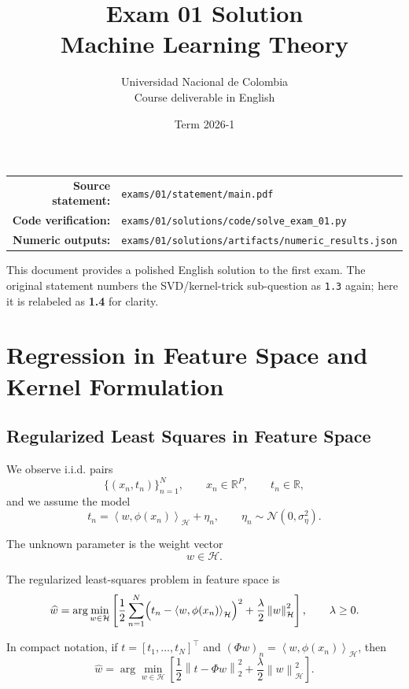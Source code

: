 \documentclass[11pt]{article}
\title{\textbf{Exam 01 Solution}\\[4pt]\large Machine Learning Theory}
\author{Universidad Nacional de Colombia\\Course deliverable in English}
\date{Term 2026-1}
\newcommand{\R}{\mathbb{R}}
\newcommand{\Hspace}{\mathcal{H}}
\newcommand{\norm}[1]{\left\lVert #1 \right\rVert}
\newcommand{\inner}[2]{\left\langle #1, #2 \right\rangle}
\newcommand{\transpose}{^{\top}}
\begin{document}
\maketitle
\thispagestyle{empty}

\begin{center}
\begin{tabular}{>{\bfseries}rl}
Source statement: & \texttt{exams/01/statement/main.pdf} \\
Code verification: & \texttt{exams/01/solutions/code/solve\_exam\_01.py} \\
Numeric outputs: & \texttt{exams/01/solutions/artifacts/numeric\_results.json}
\end{tabular}
\end{center}

\vspace{1em}

\noindent
This document provides a polished English solution to the first exam. The original statement numbers the SVD/kernel-trick sub-question as \texttt{1.3} again; here it is relabeled as \textbf{1.4} for clarity.

\tableofcontents
\newpage

\section{Regression in Feature Space and Kernel Formulation}

\subsection{Regularized Least Squares in Feature Space}

We observe i.i.d. pairs
\[
\{(x_n, t_n)\}_{n=1}^N,
\qquad
x_n \in \R^P,
\qquad
t_n \in \R,
\]
and we assume the model
\[
t_n = \inner{w}{\phi(x_n)}_{\Hspace} + \eta_n,
\qquad
\eta_n \sim \mathcal{N}(0, \sigma_\eta^2).
\]

The unknown parameter is the weight vector
\[
w \in \Hspace.
\]

The regularized least-squares problem in feature space is
\begin{equation}
\widehat{w}
=
\arg\min_{w \in \Hspace}
\left[
\frac{1}{2}
\sum_{n=1}^N
\Bigl(t_n - \inner{w}{\phi(x_n)}_{\Hspace}\Bigr)^2
+
\frac{\lambda}{2}\norm{w}_{\Hspace}^2
\right],
\qquad
\lambda \ge 0.
\label{eq:rrls-feature}
\end{equation}

In compact notation, if $t = [t_1,\dots,t_N]\transpose$ and $(\Phi w)_n = \inner{w}{\phi(x_n)}_{\Hspace}$, then
\[
\widehat{w}
=
\arg\min_{w \in \Hspace}
\left[
\frac{1}{2}\norm{t - \Phi w}_2^2
+
\frac{\lambda}{2}\norm{w}_{\Hspace}^2
\right].
\]
\end{document}
